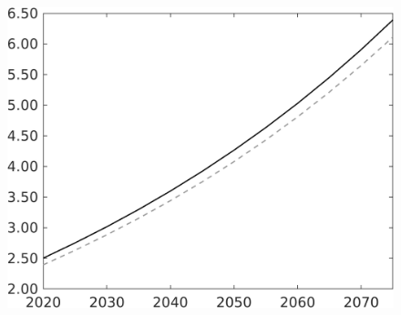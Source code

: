 \documentclass[12pt]{article}
\begin{document}
\begin{figure}[h!!]
\begin{minipage}[]{0.32\textwidth}
	\end{minipage}	
	\begin{minipage}[]{0.32\textwidth}
		\includegraphics[width=1\textwidth]{../../codding_model/own_basedOnFried/optimalPol_010922_revision/figures/all_13Sept22/CompTaul_Equlab_LFBAU_Reg0_wh_spillover0_nsk0_xgr0_knspil0_sep1_countec0_GovRev0_etaa0.79_lgd0.png}
	\end{minipage}
\end{figure}
\end{document}
